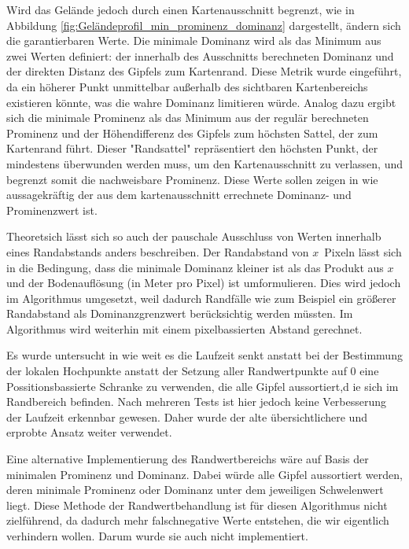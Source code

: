 Wird das Gelände jedoch durch einen Kartenausschnitt begrenzt, wie in Abbildung \ref{fig:Geländeprofil_min_prominenz_dominanz} dargestellt, ändern sich die garantierbaren Werte. Die minimale Dominanz wird als das Minimum aus zwei Werten definiert: der innerhalb des Ausschnitts berechneten Dominanz und der direkten Distanz des Gipfels zum Kartenrand. Diese Metrik wurde eingeführt, da ein höherer Punkt unmittelbar außerhalb des sichtbaren Kartenbereichs existieren könnte, was die wahre Dominanz limitieren würde. Analog dazu ergibt sich die minimale Prominenz als das Minimum aus der regulär berechneten Prominenz und der Höhendifferenz des Gipfels zum höchsten Sattel, der zum Kartenrand führt. Dieser "Randsattel" repräsentiert den höchsten Punkt, der mindestens überwunden werden muss, um den Kartenausschnitt zu verlassen, und begrenzt somit die nachweisbare Prominenz. Diese Werte sollen zeigen in wie aussagekräftig der aus dem kartenausschnitt errechnete Dominanz- und Prominenzwert ist. 

Theoretsich lässt sich so auch der pauschale Ausschluss von Werten innerhalb eines Randabstands anders beschreiben. Der Randabstand von $x$~Pixeln lässt sich in die Bedingung, dass die minimale Dominanz kleiner ist als das Produkt aus $x$ und der Bodenauflösung (in Meter pro Pixel) ist umformulieren. Dies wird jedoch im Algorithmus umgesetzt, weil dadurch Randfälle wie zum Beispiel ein größerer Randabstand als Dominanzgrenzwert berücksichtig werden müssten. Im Algorithmus wird weiterhin mit einem pixelbassierten Abstand gerechnet. 

Es wurde untersucht in wie weit es die Laufzeit senkt anstatt bei der Bestimmung der lokalen Hochpunkte anstatt der Setzung aller Randwertpunkte auf 0 eine Possitionsbassierte Schranke zu verwenden, die alle Gipfel aussortiert,d ie sich im Randbereich befinden. Nach mehreren Tests ist hier jedoch keine Verbesserung der Laufzeit erkennbar gewesen. Daher wurde der alte übersichtlichere und erprobte Ansatz weiter verwendet. 

Eine alternative Implementierung des Randwertbereichs wäre auf Basis der minimalen Prominenz und Dominanz. Dabei würde alle Gipfel aussortiert werden, deren minimale Prominenz oder Dominanz unter dem jeweiligen Schwelenwert liegt. Diese Methode der Randwertbehandlung ist für diesen Algorithmus nicht zielführend, da dadurch mehr falschnegative Werte entstehen, die wir eigentlich verhindern wollen. Darum wurde sie auch nicht implementiert.

